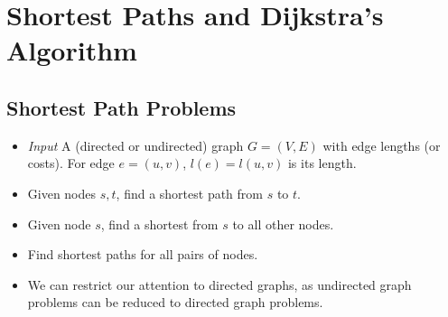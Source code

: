 \documentclass[12pt]{article}
\begin{document}
\section{Shortest Paths and Dijkstra's Algorithm}

\subsection{Shortest Path Problems}
\begin{itemize}
    \item \textit{Input} A (directed or undirected) graph $G = (V, E)$ with edge lengths (or costs). For edge $e = (u, v)$, $l(e) = l(u, v)$ is its length.
    \item Given nodes $s, t$, find a shortest path from $s$ to $t$.
    \item Given node $s$, find a shortest from $s$ to all other nodes.
    \item Find shortest paths for all pairs of nodes.
    \item We can restrict our attention to directed graphs, as undirected graph problems can be reduced to directed graph problems.
\end{itemize}
\end{document}
